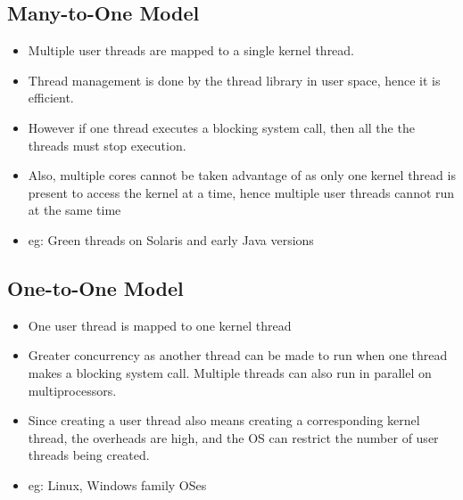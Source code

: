 \documentclass{article}
\theoremstyle{plain}
\theoremstyle{definition}
\begin{document}
\subsection{Many-to-One Model}
\begin{itemize}
    \item Multiple user threads are mapped to a single kernel thread. 
    
    \item Thread management is done by the thread library in user space, hence it is efficient.
    
    \item However if one thread executes a blocking system call, then all the the threads must stop execution. 
    
    \item Also, multiple cores cannot be taken advantage of as only one kernel thread is present to access the kernel at a time, hence multiple user threads cannot run at the same time
    
    \item eg: Green threads on Solaris and early Java versions
\end{itemize}

\subsection{One-to-One Model}
\begin{itemize}
    \item One user thread is mapped to one kernel thread
    
    \item Greater concurrency as another thread can be made to run when one thread makes a blocking system call. Multiple threads can also run in parallel on multiprocessors.
    
    \item Since creating a user thread also means creating a corresponding kernel thread, the overheads are high, and the OS can restrict the number of user threads being created.
    
    \item eg: Linux, Windows family OSes
\end{itemize}
\end{document}

